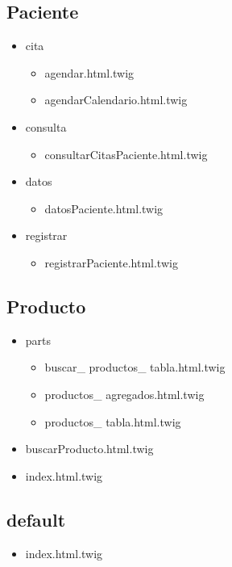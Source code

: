 		\subsection{Paciente}
		\begin{itemize}
			\item cita
			\begin{itemize}
				\item agendar.html.twig
				\item agendarCalendario.html.twig
			\end{itemize}

			\item consulta
			\begin{itemize}
				\item consultarCitasPaciente.html.twig
			\end{itemize}
			
			
			\item datos
			\begin{itemize}
			\item datosPaciente.html.twig
			\end{itemize}
			
			\item registrar
			\begin{itemize}
			\item registrarPaciente.html.twig
			\end{itemize}
			
		\end{itemize}
		\subsection{Producto}	
			\begin{itemize}
			\item parts
			\begin{itemize}
				\item buscar\_ productos\_ tabla.html.twig
				\item productos\_ agregados.html.twig
				\item productos\_ tabla.html.twig
			\end{itemize}
			\item buscarProducto.html.twig
			\item index.html.twig
			\end{itemize}

		\subsection{default}
		\begin{itemize}
			\item index.html.twig
		\end{itemize}
